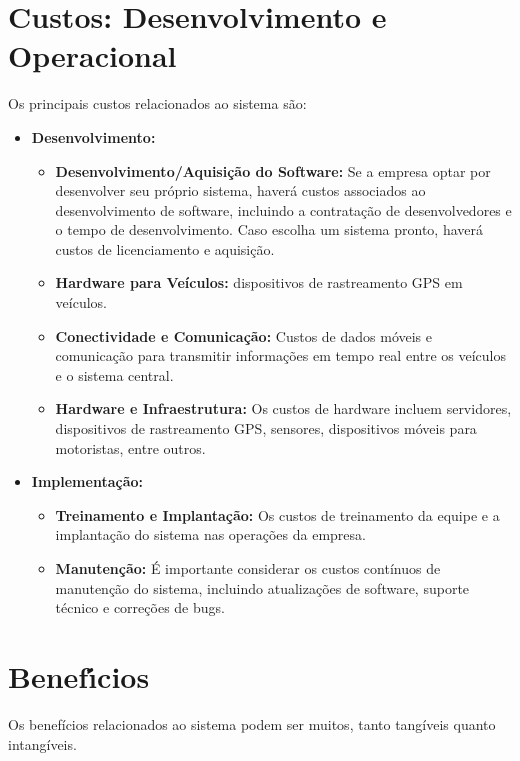 \section{Custos: Desenvolvimento e Operacional} 
Os principais custos relacionados ao sistema são: 
\begin{itemize}
	\item \textbf{Desenvolvimento:}
	\begin{itemize}
		\item \textbf{Desenvolvimento/Aquisição do Software:}  Se a empresa optar por desenvolver seu próprio sistema, haverá custos associados ao desenvolvimento de software, incluindo a contratação de desenvolvedores e o tempo de desenvolvimento. Caso escolha um sistema pronto, haverá custos de licenciamento e aquisição.
		
		\item \textbf{Hardware para Veículos:} dispositivos de rastreamento GPS em veículos.
		
		\item \textbf{Conectividade e Comunicação:} Custos de dados móveis e comunicação para transmitir informações em tempo real entre os veículos e o sistema central.
		
		\item \textbf{Hardware e Infraestrutura:} Os custos de hardware incluem servidores, dispositivos de rastreamento GPS, sensores, dispositivos móveis para motoristas, entre outros.
	\end{itemize}
	\item \textbf{Implementação:}
	\begin{itemize}
		\item \textbf{Treinamento e Implantação:} Os custos de treinamento da equipe e a implantação do sistema nas operações da empresa.
		
		\item \textbf{Manutenção:} É importante considerar os custos contínuos de manutenção do sistema, incluindo atualizações de software, suporte técnico e correções de bugs.
	\end{itemize}
\end{itemize}

\section{Benef\'{\i}cios}
Os benefícios relacionados ao sistema podem ser muitos, tanto tangíveis quanto intangíveis.

